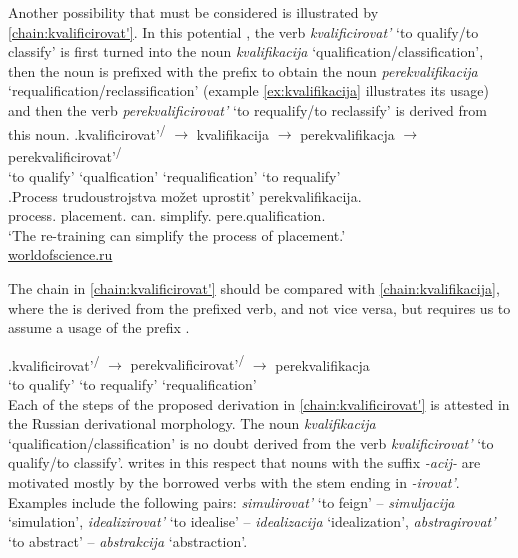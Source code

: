 Another possibility that must be considered is illustrated by \ref{chain:kvalificirovat'}. In this potential , the verb \textit{kvalificirovat'} `to qualify/to classify' is first turned into the noun \textit{kvalifikacija} `qualification\slash classification', then the noun is prefixed with the prefix  to obtain the noun \textit{perekvalifikacija}  `requalification/reclassification' (example \ref{ex:kvalifikacija} illustrates its usage) and then the verb \textit{perekvalificirovat'} `to requalify/to reclassify' is derived from this noun. 
\exg.\label{chain:kvalificirovat'}kvalificirovat'\textsuperscript{\PF\slash\IPF} {$\rightarrow$} kvalifikacija {$\rightarrow$} perekvalifikacja {$\rightarrow$} {perekvalificirovat'\textsuperscript{\PF\slash\IPF}}\\
{`to qualify'} {} {`qualfication'} {} {`requalification'} {} {`to requalify'}\\

\exg.\label{ex:kvalifikacija}Process trudoustrojstva mo\v{z}et uprostit' perekvalifikacija.\\
process. placement. can. simplify. pere.qualification.\\
\trans `The re-training can simplify the process of placement.'\\\hbox{}\hfill\hbox{\url{worldofscience.ru}}

The chain in \ref{chain:kvalificirovat'} should be compared with \ref{chain:kvalifikacija}, where the  is derived from the prefixed verb, and not vice versa, but requires us to assume a  usage of the prefix .

\exg.\label{chain:kvalifikacija}kvalificirovat'\textsuperscript{\PF\slash\IPF} {$\rightarrow$} {perekvalificirovat'\textsuperscript{\PF\slash\IPF}} {$\rightarrow$} perekvalifikacja\\
{`to qualify'} {} {`to requalify'} {} {`requalification'}\\

Each of the steps of the proposed derivation in \ref{chain:kvalificirovat'} is attested in the Russian derivational morphology. The noun \textit{kvalifikacija} `qualification\slash classification' is no doubt derived from the verb \textit{kvalificirovat'} `to qualify/to classify'. \citet{Shvedova:82} writes in this respect that nouns with the suffix \textit{-acij-} are motivated mostly by the borrowed verbs with the stem ending in \textit{-irovat'}. Examples \citep[taken from][159]{Shvedova:82} include the following pairs: \textit{simulirovat'} `to feign' -- \textit{simuljacija} `simulation', \textit{idealizirovat'} `to idealise'  -- \textit{idealizacija} `idealization', \textit{abstragirovat'} `to abstract' -- \textit{abstrakcija} `abstraction'.

